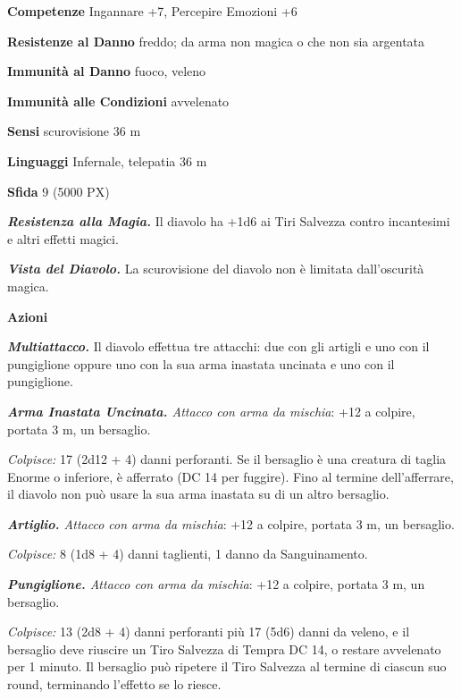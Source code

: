 \begin{multicols}{2}
	\textbf{Competenze} Ingannare +7, Percepire Emozioni +6

	\textbf{Resistenze al Danno} freddo; da arma non magica o che non sia argentata

	\textbf{Immunità al Danno} fuoco, veleno

	\textbf{Immunità alle Condizioni} avvelenato

	\textbf{Sensi} scurovisione 36 m

	\textbf{Linguaggi} Infernale, telepatia 36 m

	\textbf{Sfida} 9 (5000 PX)

	\textit{\textbf{Resistenza alla Magia.}} Il diavolo ha +1d6 ai Tiri Salvezza contro incantesimi e altri effetti magici.

	\textit{\textbf{Vista del Diavolo.}} La scurovisione del diavolo non è limitata dall'oscurità magica.

	\textbf{Azioni}

	\textit{\textbf{Multiattacco.}} Il diavolo effettua tre attacchi: due con gli artigli e uno con il pungiglione oppure uno con la sua arma inastata uncinata e uno con il pungiglione.

	\textit{\textbf{Arma Inastata Uncinata.} Attacco con arma da mischia}: +12 a colpire, portata 3 m, un bersaglio.

	\textit{Colpisce:} 17 (2d12 + 4) danni perforanti. Se il bersaglio è una creatura di taglia Enorme o inferiore, è afferrato (DC 14 per fuggire). Fino al termine dell'afferrare, il diavolo non può usare la sua arma inastata su di un altro bersaglio.

	\textit{\textbf{Artiglio.} Attacco con arma da mischia}: +12 a colpire, portata 3 m, un bersaglio.

	\textit{Colpisce:} 8 (1d8 + 4) danni taglienti, 1 danno da Sanguinamento.

	\textit{\textbf{Pungiglione.} Attacco con arma da mischia}: +12 a colpire, portata 3 m, un bersaglio.

	\textit{Colpisce:} 13 (2d8 + 4) danni perforanti più 17 (5d6) danni da veleno, e il bersaglio deve riuscire un Tiro Salvezza di Tempra DC 14, o restare avvelenato per 1 minuto. Il bersaglio può ripetere il Tiro Salvezza al termine di ciascun suo round, terminando l'effetto se lo riesce.


\end{multicols}
